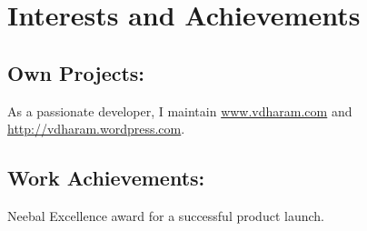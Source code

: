 \documentclass{article}
\begin{document}
\section{Interests and Achievements}
\subsection{Own Projects:}
As a passionate developer, I maintain \href{www.vdharam.com}{www.vdharam.com} and \href{http://vdharam.wordpress.com}{http://vdharam.wordpress.com}.
\subsection{Work Achievements:}
Neebal Excellence award for a successful product launch.
\end{document}
